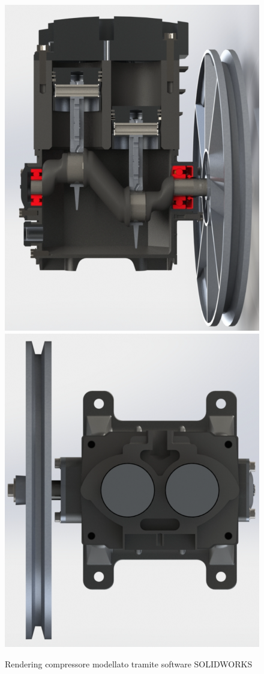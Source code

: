 \newpage
\begin{figure}[h]
    \centering
    \includegraphics[scale=0.4]{Immagini/RenderingCompressore3.png}
    \includegraphics[scale=0.4]{Immagini/RenderingCompressore4.png}
    \caption{Rendering compressore modellato tramite software SOLIDWORKS}
    \label{fig:rendering34}
\end{figure}